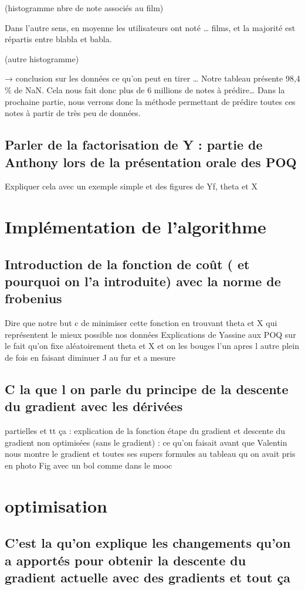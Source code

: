 \documentclass[a4paper,10pt]{article}
\begin{document}
(histogramme nbre de note associés au film)

Dans l’autre sens, en moyenne les utilisateurs ont noté … films, et la majorité est répartis entre blabla et babla.

(autre histogramme)

→ conclusion sur les données ce qu’on peut en tirer …
Notre tableau présente 98,4 \% de NaN. Cela nous fait donc plus de 6 millions de notes à prédire… Dans la prochaine partie, nous verrons donc la méthode permettant de prédire toutes ces notes à partir de très peu de données.

\subsection{Parler de la factorisation de Y : partie de Anthony lors de la présentation orale des POQ}
Expliquer cela avec un exemple simple et des figures de Yf, theta et X
\section{Implémentation de l’algorithme}
\subsection{Introduction de la fonction de coût ( et pourquoi on l'a introduite) avec la norme de frobenius}
Dire que notre but c de minimiser cette fonction en trouvant theta et X qui représentent le mieux possible nos données 
    Explications de Yassine aux POQ sur le fait qu’on fixe aléatoirement theta et X et on les bouges l'un apres l autre plein de fois en faisant diminuer J au fur et a mesure
\subsection{C la que l on parle du principe de la descente du gradient avec les dérivées}
partielles et tt ça : explication de la fonction étape du gradient et descente du gradient non optimisées (sans le gradient) : ce qu'on faisait avant que Valentin nous montre le gradient et toutes ses supers formules au tableau qu on avait pris en photo
Fig avec un bol comme dans le mooc
\section{optimisation}
\subsection{C'est la qu'on explique les changements qu'on a apportés pour obtenir la descente du gradient actuelle avec des gradients et tout ça}
\end{document}
